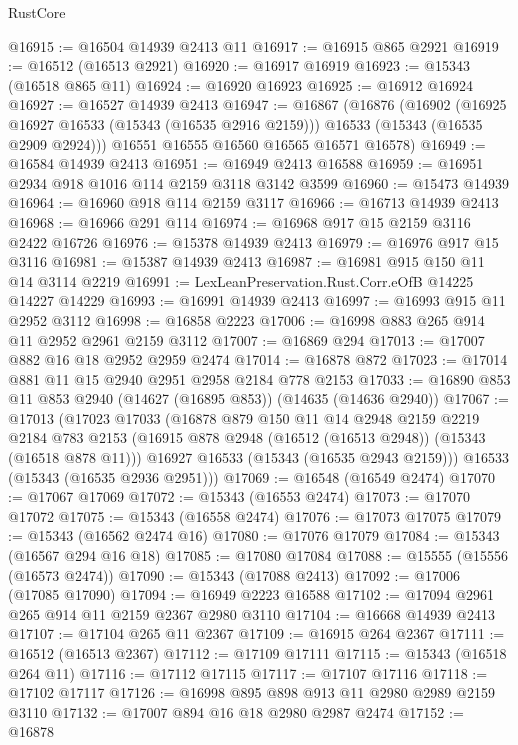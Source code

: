 \begin{lexlean}{RustCore}
\begin{coremodule}
@16915 := @16504 @14939 @2413 @11
@16917 := @16915 @865 @2921
@16919 := @16512 (@16513 @2921)
@16920 := @16917 @16919
@16923 := @15343 (@16518 @865 @11)
@16924 := @16920 @16923
@16925 := @16912 @16924
@16927 := @16527 @14939 @2413
@16947 := @16867
    (@16876
      (@16902
        (@16925 @16927 @16533 (@15343 (@16535 @2916 @2159)))
        @16533
        (@15343 (@16535 @2909 @2924)))
      @16551
      @16555
      @16560
      @16565
      @16571
      @16578)
@16949 := @16584 @14939 @2413
@16951 := @16949 @2413 @16588
@16959 := @16951 @2934 @918 @1016 @114 @2159 @3118 @3142 @3599
@16960 := @15473 @14939
@16964 := @16960 @918 @114 @2159 @3117
@16966 := @16713 @14939 @2413
@16968 := @16966 @291 @114
@16974 := @16968 @917 @15 @2159 @3116 @2422 @16726
@16976 := @15378 @14939 @2413
@16979 := @16976 @917 @15 @3116
@16981 := @15387 @14939 @2413
@16987 := @16981 @915 @150 @11 @14 @3114 @2219
@16991 := LexLeanPreservation.Rust.Corr.eOfB @14225 @14227 @14229
@16993 := @16991 @14939 @2413
@16997 := @16993 @915 @11 @2952 @3112
@16998 := @16858 @2223
@17006 := @16998 @883 @265 @914 @11 @2952 @2961 @2159 @3112
@17007 := @16869 @294
@17013 := @17007 @882 @16 @18 @2952 @2959 @2474
@17014 := @16878 @872
@17023 := @17014 @881 @11 @15 @2940 @2951 @2958 @2184 @778 @2153
@17033 := @16890 @853 @11 @853 @2940 (@14627 (@16895 @853)) (@14635 (@14636 @2940))
@17067 := @17013
    (@17023
      @17033
      (@16878
        @879
        @150
        @11
        @14
        @2948
        @2159
        @2219
        @2184
        @783
        @2153
        (@16915 @878 @2948 (@16512 (@16513 @2948)) (@15343 (@16518 @878 @11)))
        @16927
        @16533
        (@15343 (@16535 @2943 @2159)))
      @16533
      (@15343 (@16535 @2936 @2951)))
@17069 := @16548 (@16549 @2474)
@17070 := @17067 @17069
@17072 := @15343 (@16553 @2474)
@17073 := @17070 @17072
@17075 := @15343 (@16558 @2474)
@17076 := @17073 @17075
@17079 := @15343 (@16562 @2474 @16)
@17080 := @17076 @17079
@17084 := @15343 (@16567 @294 @16 @18)
@17085 := @17080 @17084
@17088 := @15555 (@15556 (@16573 @2474))
@17090 := @15343 (@17088 @2413)
@17092 := @17006 (@17085 @17090)
@17094 := @16949 @2223 @16588
@17102 := @17094 @2961 @265 @914 @11 @2159 @2367 @2980 @3110
@17104 := @16668 @14939 @2413
@17107 := @17104 @265 @11 @2367
@17109 := @16915 @264 @2367
@17111 := @16512 (@16513 @2367)
@17112 := @17109 @17111
@17115 := @15343 (@16518 @264 @11)
@17116 := @17112 @17115
@17117 := @17107 @17116
@17118 := @17102 @17117
@17126 := @16998 @895 @898 @913 @11 @2980 @2989 @2159 @3110
@17132 := @17007 @894 @16 @18 @2980 @2987 @2474
@17152 := @16878

\end{coremodule}
\end{lexlean}
